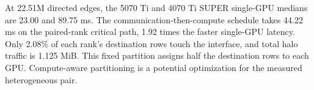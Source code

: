 At 22.51M directed edges, the 5070 Ti and 4070 Ti SUPER single-GPU medians are 23.00 and 89.75 ms. The communication-then-compute schedule takes 44.22 ms on the paired-rank critical path, 1.92 times the faster single-GPU latency. Only 2.08\% of each rank's destination rows touch the interface, and total halo traffic is 1.125 MiB. This fixed partition assigns half the destination rows to each GPU. Compute-aware partitioning is a potential optimization for the measured heterogeneous pair.
